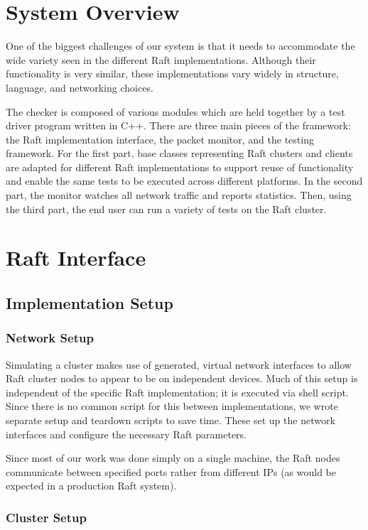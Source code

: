 \documentclass[UTF8]{article}
\begin{document}
\section{System Overview}
One of the biggest challenges of our system is that it needs to accommodate the wide variety seen in the different Raft implementations. Although their functionality is very similar, these implementations vary widely in structure, language, and networking choices.

The checker is composed of various modules which are held together by a test driver program written in C++. There are three main pieces of the framework: the Raft implementation interface, the packet monitor, and the testing framework. For the first part, base classes representing Raft clusters and clients are adapted for different Raft implementations to support reuse of functionality and enable the same tests to be executed across different platforms. In the second part, the monitor watches all network traffic and reports statistics. Then, using the third part, the end user can run a variety of tests on the Raft cluster.

\section{Raft Interface}

\subsection{Implementation Setup}

\subsubsection{Network Setup}

Simulating a cluster makes use of generated, virtual network interfaces to allow Raft cluster nodes to appear to be on independent devices. Much of this setup is independent of the specific Raft implementation; it is executed via shell script. Since there is no common script for this between implementations, we wrote separate setup and teardown scripts to save time. These set up the network interfaces and configure the necessary Raft parameters.

Since most of our work was done simply on a single machine, the Raft nodes communicate between specified ports rather from different IPs (as would be expected in a production Raft system).

\subsubsection{Cluster Setup}
\end{document}
